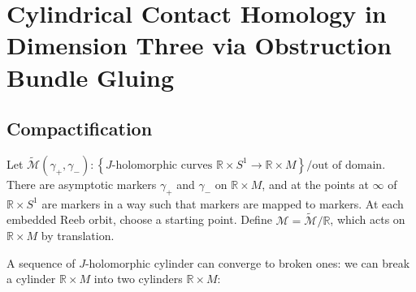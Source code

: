 \chapter{Cylindrical Contact Homology in Dimension Three via Obstruction Bundle Gluing}
\label{b2}

\section{Compactification}

Let $\tilde{\mathcal{M}}(\gamma_+, \gamma_-): \left\{J\text{-holomorphic curves }\mathbb{R}\times S^1 \to \mathbb{R}\times M \right\}/\text{out of domain}$. There are asymptotic markers $\gamma_+$ and $\gamma_-$ on $\mathbb{R}\times M$, and at the points at $\infty$ of $\mathbb{R}\times S^1$ are markers in a way such that markers are mapped to markers. At each embedded Reeb orbit, choose a starting point. Define $\mathcal{M}=\tilde{\mathcal{M}}/\mathbb{R}$, which acts on $\mathbb{R}\times M$ by translation.

A sequence of $J$-holomorphic cylinder can converge to broken ones: we can break a cylinder $\mathbb{R}\times M$ into two cylinders $\mathbb{R}\times M$:

